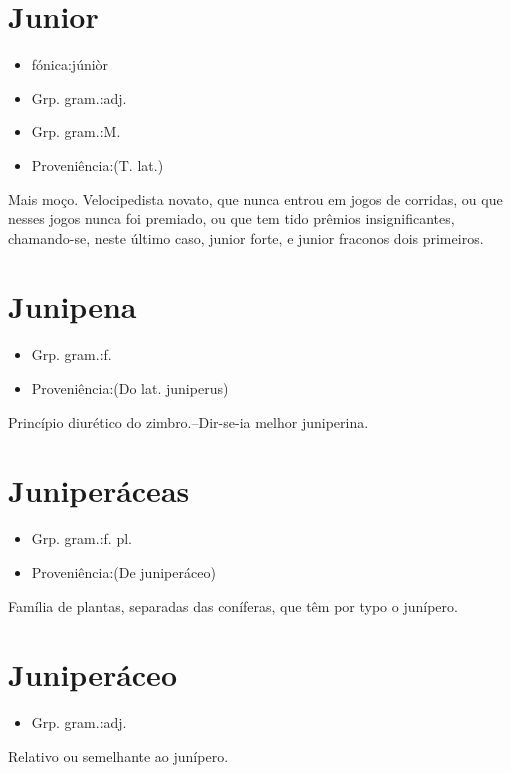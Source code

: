 \documentclass{article}
\begin{document}
\section{Junior}
\begin{itemize}
\item {fónica:júniòr}
\end{itemize}
\begin{itemize}
\item {Grp. gram.:adj.}
\end{itemize}
\begin{itemize}
\item {Grp. gram.:M.}
\end{itemize}
\begin{itemize}
\item {Proveniência:(T. lat.)}
\end{itemize}
Mais moço.
Velocipedista novato, que nunca entrou em jogos de corridas, ou que nesses jogos nunca foi premiado, ou que tem tido prêmios insignificantes, chamando-se, neste último caso, \textunderscore junior forte\textunderscore , e \textunderscore junior fraco\textunderscore  nos dois primeiros.
\section{Junipena}
\begin{itemize}
\item {Grp. gram.:f.}
\end{itemize}
\begin{itemize}
\item {Proveniência:(Do lat. \textunderscore juniperus\textunderscore )}
\end{itemize}
Princípio diurético do zimbro.--Dir-se-ia melhor \textunderscore juniperina\textunderscore .
\section{Juniperáceas}
\begin{itemize}
\item {Grp. gram.:f. pl.}
\end{itemize}
\begin{itemize}
\item {Proveniência:(De \textunderscore juniperáceo\textunderscore )}
\end{itemize}
Família de plantas, separadas das coníferas, que têm por typo o junípero.
\section{Juniperáceo}
\begin{itemize}
\item {Grp. gram.:adj.}
\end{itemize}
Relativo ou semelhante ao junípero.
\end{document}
